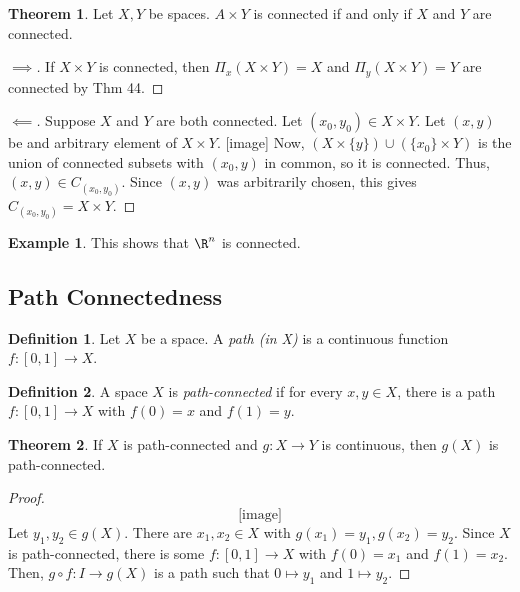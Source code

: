 \documentclass[a5paper]{article}
\theoremstyle{definition}%
\newtheorem{theorem}{Theorem}
\newtheorem*{definition*}{Definition}
\newtheorem*{example*}{Example}
\numberwithin{exercise}{section}
\theoremstyle{remark}%
\begin{document}
\begin{highlight}
\begin{theorem}
Let $X,Y$ be spaces. $A\times Y$ is connected if and only if $X$ and $Y$ are connected. 
\end{theorem}
\end{highlight}
\begin{proof}[$\implies$]
If $X\times	Y$ is connected, then $\Pi_x(X\times Y)=X$ and $\Pi_y(X\times Y)=Y$ are connected by Thm 44. 
\end{proof}
\begin{proof}[$\impliedby$]
Suppose $X$ and $Y$ are both connected. Let $(x_0, y_0)\in X\times Y$. Let $(x,y)$ be and arbitrary element of $X\times Y$. 
[image]
Now, $(X\times \{y\})\cup (\{x_0\}\times Y)$ is the union of connected subsets with $(x_0,y)$ in common, so it is connected. Thus, $(x,y)\in C_{(x_0,y_0)}$. Since $(x,y)$ was arbitrarily chosen, this gives $C_{(x_0,y_0)}=X\times Y$. 
\end{proof}
\begin{example*}
This shows that $\R^n$ is connected. 
\end{example*}

\subsection{Path Connectedness}

\begin{highlight}
\begin{definition*}
Let $X$ be a space. A \emph{path (in X)} is a continuous function $f:[0,1]\to X$. 
\end{definition*}
\end{highlight}

\begin{highlight}
\begin{definition*}
A space $X$ is \emph{path-connected} if for every $x,y\in X$, there is a path $f:[0,1]\to X$ with $f(0)=x$ and $f(1)=y$. 
\end{definition*}
\end{highlight}

\begin{highlight}
\begin{theorem}
If $X$ is path-connected and $g:X\to Y$ is continuous, then $g(X)$ is path-connected. 
\end{theorem}
\end{highlight}
\begin{proof}\mbox{}
$$\text{[image]}$$
Let $y_1, y_2 \in g(X)$. There are $x_1, x_2\in X$ with $g(x_1)=y_1, g(x_2)=y_2$. Since $X$ is path-connected, there is some $f:[0,1]\to X$ with $f(0)=x_1$ and $f(1)=x_2$. Then, $g\circ f:I\to g(X)$ is a path such that $0 \mapsto y_1$ and $1 \mapsto y_2$. 
\end{proof}
\end{document}

